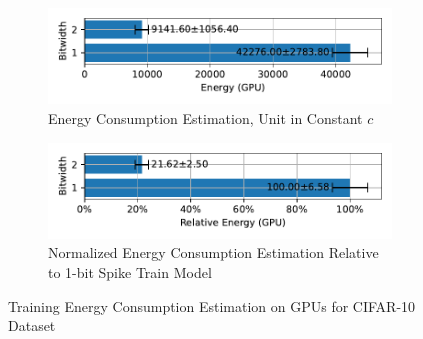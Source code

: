         \begin{figure}[H]
            \centering
            \begin{subfigure}[H]{\textwidth}
                \includegraphics[width=\textwidth]{../timesteps/CIFAR10/plots/cifar10_train_energy_gpu_horizontal.pdf}
                \caption{Energy Consumption Estimation, Unit in Constant $c$}
            \end{subfigure}
            \hfill
            \begin{subfigure}[H]{\textwidth}
                \includegraphics[width=\textwidth]{../timesteps/CIFAR10/plots/cifar10_train_relative_energy_gpu_horizontal.pdf}
                \caption{Normalized Energy Consumption Estimation Relative to 1-bit Spike Train Model}
            \end{subfigure}
            \caption{Training Energy Consumption Estimation on GPUs for CIFAR-10 Dataset}
        \end{figure}


